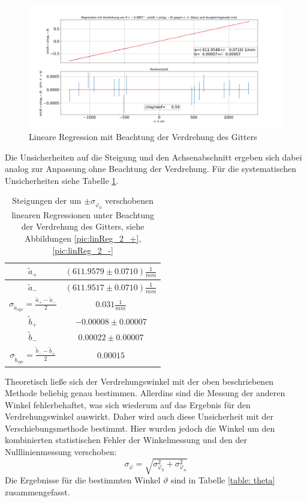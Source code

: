\documentclass[a4paper, 11pt]{article}
\begin{document}
\begin{figure}[H]
	\hskip-2cm
	\includegraphics[scale=0.4]{./Bilder/Gitter_Regression_mit_Verdrehung.png}
	\caption{Lineare Regression mit Beachtung der Verdrehung des Gitters}
	\label{pic:linReg_2}	
\end{figure}

Die Unsicherheiten auf die Steigung und den Achsenabschnitt ergeben sich dabei analog zur Anpassung ohne Beachtung der Verdrehung. Für die systematischen Unsicherheiten siehe Tabelle \ref{table: aSys_2}.

\begin{table}[H]
	\renewcommand{\arraystretch}{1.5}
	\large
	\centering
	\begin{tabular}{|c|c|}
		\hline
		$\tilde{a}_+$	&	$(611.9579 \pm 0.0710) \frac{1}{mm}$ \\
		\hline
		$\tilde{a}_-$	&	$(611.9517 \pm 0.0710) \frac{1}{mm}$ \\
		\hline
		$\sigma_{\tilde{a}_{sys}} = \frac{\tilde{a}_+ - \tilde{a}_-}{2}$	&	$ 0.031 \frac{1}{mm} $ \\
		\hline
		$\tilde{b}_+$	&	$-0.00008 \pm 0.00007$ \\
		\hline
		$\tilde{b}_-$	&	$0.00022 \pm 0.00007$ \\
		\hline
		$\sigma_{\tilde{b}_{sys}} = \frac{\tilde{b}_- - \tilde{b}_+}{2}$	&	$ 0.00015 $ \\
		\hline
	\end{tabular}
	\caption{Steigungen der um $\pm \sigma_{\varphi_0}$ verschobenen linearen Regressionen unter Beachtung der Verdrehung des Gitters, siehe Abbildungen \ref{pic:linReg_2_+}, \ref{pic:linReg_2_-}}
	\label{table: aSys_2}
\end{table}

Theoretisch ließe sich der Verdrehungswinkel mit der oben beschriebenen Methode beliebig genau bestimmen. Allerdins sind die Messung der anderen Winkel fehlerbehaftet, was sich wiederum auf das Ergebnis für den Verdrehungswinkel auswirkt. Daher wird auch diese Unsicherheit mit der Verschiebungsmethode bestimmt. Hier wurden jedoch die Winkel um den kombinierten statistischen Fehler der Winkelmessung und den der Nulllinienmessung verschoben:
\begin{equation*}\label{eq:FehlerPhi}
\sigma_{\varphi} = \sqrt{\sigma_{\varphi_0}^2 + \sigma_{\varphi_n}^2}
\end{equation*}
Die Ergebnisse für die bestimmten Winkel $\vartheta$ sind in Tabelle \ref{table: theta} zusammengefasst.
\end{document}
